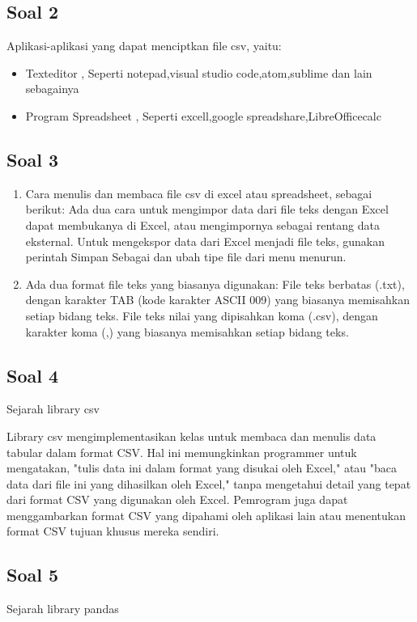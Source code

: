 \subsection{Soal 2}
Aplikasi-aplikasi yang dapat menciptkan file csv, yaitu:

\begin{itemize}
\item Texteditor , Seperti notepad,visual studio code,atom,sublime dan lain sebagainya
\item Program Spreadsheet , Seperti excell,google spreadshare,LibreOfficecalc
\end{itemize}

\subsection{Soal 3}
\begin{enumerate}
\item Cara menulis dan membaca file csv di excel atau spreadsheet, sebagai berikut:
 Ada dua cara untuk mengimpor data dari file teks dengan Excel dapat membukanya di Excel, atau mengimpornya sebagai rentang data eksternal. Untuk mengekspor data dari Excel menjadi file teks, gunakan perintah Simpan Sebagai dan ubah tipe file dari menu menurun.
\item Ada dua format file teks yang biasanya digunakan:
File teks berbatas (.txt), dengan karakter TAB (kode karakter ASCII 009) yang biasanya memisahkan setiap bidang teks.
File teks nilai yang dipisahkan koma (.csv), dengan karakter koma (,) yang biasanya memisahkan setiap bidang teks.
\end{enumerate}

\subsection{Soal 4}
Sejarah library csv

Library csv mengimplementasikan kelas untuk membaca dan menulis data tabular dalam format CSV. Hal ini memungkinkan programmer untuk mengatakan, "tulis data ini dalam format yang disukai oleh Excel," atau "baca data dari file ini yang dihasilkan oleh Excel," tanpa mengetahui detail yang tepat dari format CSV yang digunakan oleh Excel. Pemrogram juga dapat menggambarkan format CSV yang dipahami oleh aplikasi lain atau menentukan format CSV tujuan khusus mereka sendiri.

\subsection{Soal 5}
Sejarah library pandas

